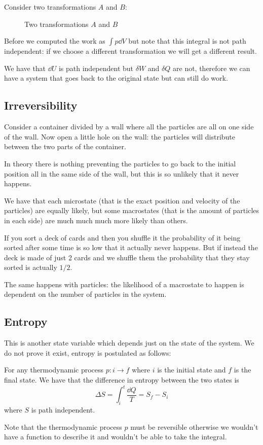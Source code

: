\documentclass[12pt]{extarticle}
\begin{document}
Consider two transformations $A$ and $B$:
\begin{figure}[H]
    \centering
    
    \caption{Two transformations $A$ and $B$}
\end{figure}

Before we computed the work as $\int p \dd{V}$ but note that this integral is not path independent: if we choose a different transformation we will get a different result.

We have that $\dd{U}$ is path independent but $\delta W$ and $\delta Q$ are not, therefore we can have a system that goes back to the original state but can still do work.

\subsection{Irreversibility}

Consider a container divided by a wall where all the particles are all on one side of the wall. Now open a little hole on the wall: the particles will distribute between the two parts of the container.

In theory there is nothing preventing the particles to go back to the initial position all in the same side of the wall, but this is so unlikely that it never happens.

We have that each microstate (that is the exact position and velocity of the particles) are equally likely, but some macrostates (that is the amount of particles in each side) are much much much more likely than others.

If you sort a deck of cards and then you shuffle it the probability of it being sorted after some time is so low that it actually never happens.
But if instead the deck is made of just 2 cards and we shuffle them the probability that they stay sorted is actually $1/2$.

The same happens with particles:
the likelihood of a macrostate to happen is dependent on the number of particles in the system.

\subsection{Entropy}

This is another state variable which depends just on the state of the system.
We do not prove it exist, entropy is postulated as follows:

\begin{definition}[entropy]
    For any thermodynamic process $p: i \to f$ where $i$ is the initial state and $f$ is the final state. We have that the difference in entropy between the two states is
    \begin{equation}
        \Delta S = \int_i^t \frac{\dd{Q}}{T} = S_f - S_i
    \end{equation}
    where $S$ is path independent.

    Note that the thermodynamic process $p$ must be reversible otherwise we wouldn't have a function to describe it and wouldn't be able to take the integral.
\end{definition}
\end{document}

